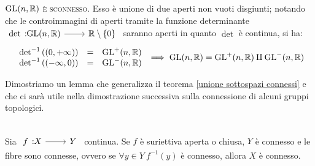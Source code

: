 \begin{observe}
$\operatorname{GL}(n,\mathbb{R})$\textsc{ è sconnesso}.
Esso è unione di due aperti non vuoti disgiunti; notando che le controimmagini di aperti tramite la funzione determinante $\funz \det {\gl(n,\realset)} {\realset\setminus\{0\}}$ saranno aperti in quanto $\det$ è continua, si ha:
		\begin{gather*}
			\begin{array}{lcl}
				\det^{-1} \left( (0,+\infty)\right) & = & \operatorname{GL} ^+ (n,\mathbb{R}) \\
				\det^{-1} \left( (-\infty,0)\right) & = & \operatorname{GL} ^- (n,\mathbb{R}) \\
			\end{array}
		\implies \operatorname{GL}(n,\mathbb{R})=\operatorname{GL}^+(n,\mathbb{R}) \amalg \operatorname{GL}^-(n,\mathbb{R})
		\end{gather*}
	\vspace{-3mm}
\end{observe}
 Dimostriamo un lemma che generalizza il teorema \ref{unione sottospazi connessi} e che ci sarà utile nella dimostrazione successiva sulla connessione di alcuni gruppi topologici.
\begin{lemming}~{}\label{connessione e fibre}\\
	Sia $\funz f X Y$ continua. Se $f$ è suriettiva aperta o chiusa, $Y$ è connesso e le fibre sono connesse, ovvero se $\forall y\in Y \ f^{-1}(y)$ è connesso, allora $X$ è connesso.
\end{lemming}
